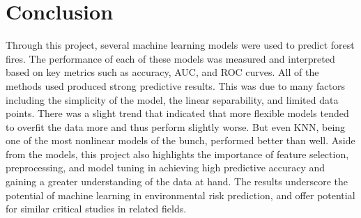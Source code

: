 \documentclass[
]{article}
\begin{document}
\section{Conclusion}\label{conclusion}

Through this project, several machine learning models were used to
predict forest fires. The performance of each of these models was
measured and interpreted based on key metrics such as accuracy, AUC, and
ROC curves. All of the methods used produced strong predictive results.
This was due to many factors including the simplicity of the model, the
linear separability, and limited data points. There was a slight trend
that indicated that more flexible models tended to overfit the data more
and thus perform slightly worse. But even KNN, being one of the most
nonlinear models of the bunch, performed better than well. Aside from
the models, this project also highlights the importance of feature
selection, preprocessing, and model tuning in achieving high predictive
accuracy and gaining a greater understanding of the data at hand. The
results underscore the potential of machine learning in environmental
risk prediction, and offer potential for similar critical studies in
related fields.
\end{document}

